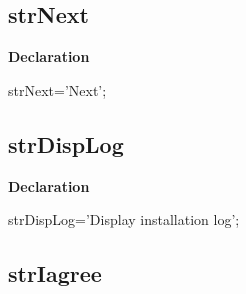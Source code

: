 \documentclass{report}
\newif\ifpdf
\begin{document}
\subsection*{strNext}
\fi
\label{trstrings-strNext}
\begin{list}{}{
\setlength{\itemindent}{0cm}
\setlength{\listparindent}{0cm}
\setlength{\leftmargin}{\evensidemargin}
\addtolength{\leftmargin}{\tmplength}
\settowidth{\labelsep}{X}
\addtolength{\leftmargin}{\labelsep}
\setlength{\labelwidth}{\tmplength}
}
\item[\textbf{Declaration}\hfill]
\ifpdf
\begin{flushleft}
\fi
\begin{ttfamily}
strNext='Next';\end{ttfamily}

\ifpdf
\end{flushleft}
\fi

\end{list}
\ifpdf
\subsection*{\large{\textbf{strDispLog}}\normalsize\hspace{1ex}\hrulefill}
\else
\subsection*{strDispLog}
\fi
\label{trstrings-strDispLog}
\begin{list}{}{
\setlength{\itemindent}{0cm}
\setlength{\listparindent}{0cm}
\setlength{\leftmargin}{\evensidemargin}
\addtolength{\leftmargin}{\tmplength}
\settowidth{\labelsep}{X}
\addtolength{\leftmargin}{\labelsep}
\setlength{\labelwidth}{\tmplength}
}
\item[\textbf{Declaration}\hfill]
\ifpdf
\begin{flushleft}
\fi
\begin{ttfamily}
strDispLog='Display installation log';\end{ttfamily}

\ifpdf
\end{flushleft}
\fi

\end{list}
\ifpdf
\subsection*{\large{\textbf{strIagree}}\normalsize\hspace{1ex}\hrulefill}
\else
\end{document}
